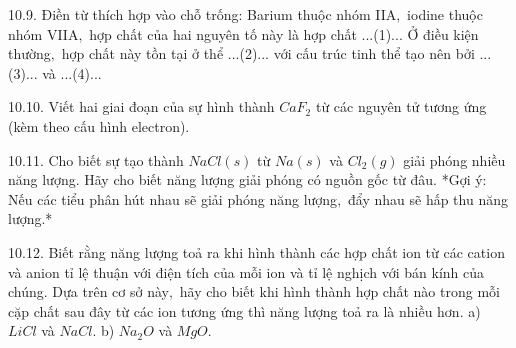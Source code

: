 10.9. Điền từ thích hợp vào chỗ trống:
Barium thuộc nhóm IIA$,$ iodine thuộc nhóm VIIA$,$ hợp chất của hai nguyên tố này là hợp chất ...(1)... Ở điều kiện thường$,$ hợp chất này tồn tại ở thể ...(2)... với cấu trúc tinh thể tạo nên bởi ...(3)... và ...(4)...

10.10. Viết hai giai đoạn của sự hình thành $CaF_2$ từ các nguyên tử tương ứng (kèm theo cấu hình electron).

10.11. Cho biết sự tạo thành $NaCl(s)$ từ $Na(s)$ và $Cl_2(g)$ giải phóng nhiều năng lượng. Hãy cho biết năng lượng giải phóng có nguồn gốc từ đâu.
*Gợi ý: Nếu các tiểu phân hút nhau sẽ giải phóng năng lượng$,$ đẩy nhau sẽ hấp thu năng lượng.*

10.12. Biết rằng năng lượng toả ra khi hình thành các hợp chất ion từ các cation và anion tỉ lệ thuận với điện tích của mỗi ion và tỉ lệ nghịch với bán kính của chúng. Dựa trên cơ sở này$,$ hãy cho biết khi hình thành hợp chất nào trong mỗi cặp chất sau đây từ các ion tương ứng thì năng lượng toả ra là nhiều hơn.
a) $LiCl$ và $NaCl$.
b) $Na_2O$ và $MgO$.





